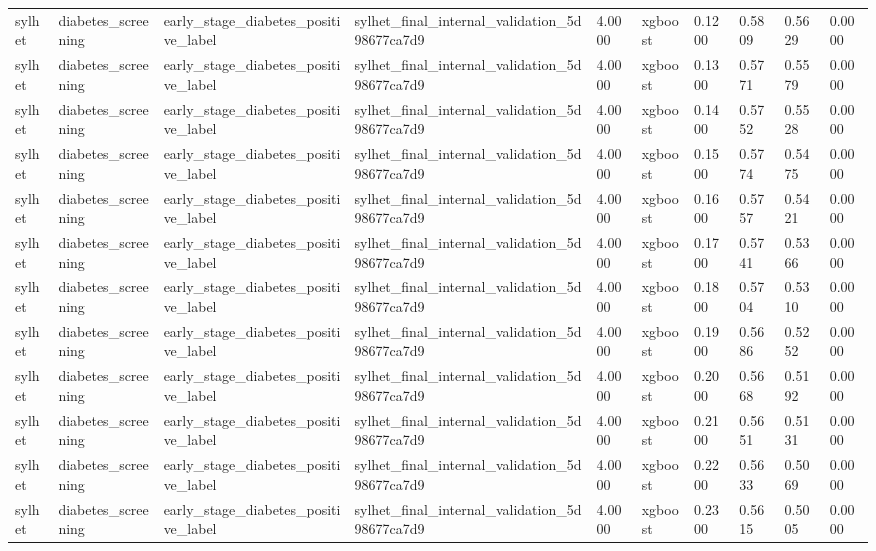 \begin{tabular}{llllllllll}
sylhet & diabetes\_screening & early\_stage\_diabetes\_positive\_label & sylhet\_final\_internal\_validation\_5d98677ca7d9 & 4.0000 & xgboost & 0.1200 & 0.5809 & 0.5629 & 0.0000 \\
sylhet & diabetes\_screening & early\_stage\_diabetes\_positive\_label & sylhet\_final\_internal\_validation\_5d98677ca7d9 & 4.0000 & xgboost & 0.1300 & 0.5771 & 0.5579 & 0.0000 \\
sylhet & diabetes\_screening & early\_stage\_diabetes\_positive\_label & sylhet\_final\_internal\_validation\_5d98677ca7d9 & 4.0000 & xgboost & 0.1400 & 0.5752 & 0.5528 & 0.0000 \\
sylhet & diabetes\_screening & early\_stage\_diabetes\_positive\_label & sylhet\_final\_internal\_validation\_5d98677ca7d9 & 4.0000 & xgboost & 0.1500 & 0.5774 & 0.5475 & 0.0000 \\
sylhet & diabetes\_screening & early\_stage\_diabetes\_positive\_label & sylhet\_final\_internal\_validation\_5d98677ca7d9 & 4.0000 & xgboost & 0.1600 & 0.5757 & 0.5421 & 0.0000 \\
sylhet & diabetes\_screening & early\_stage\_diabetes\_positive\_label & sylhet\_final\_internal\_validation\_5d98677ca7d9 & 4.0000 & xgboost & 0.1700 & 0.5741 & 0.5366 & 0.0000 \\
sylhet & diabetes\_screening & early\_stage\_diabetes\_positive\_label & sylhet\_final\_internal\_validation\_5d98677ca7d9 & 4.0000 & xgboost & 0.1800 & 0.5704 & 0.5310 & 0.0000 \\
sylhet & diabetes\_screening & early\_stage\_diabetes\_positive\_label & sylhet\_final\_internal\_validation\_5d98677ca7d9 & 4.0000 & xgboost & 0.1900 & 0.5686 & 0.5252 & 0.0000 \\
sylhet & diabetes\_screening & early\_stage\_diabetes\_positive\_label & sylhet\_final\_internal\_validation\_5d98677ca7d9 & 4.0000 & xgboost & 0.2000 & 0.5668 & 0.5192 & 0.0000 \\
sylhet & diabetes\_screening & early\_stage\_diabetes\_positive\_label & sylhet\_final\_internal\_validation\_5d98677ca7d9 & 4.0000 & xgboost & 0.2100 & 0.5651 & 0.5131 & 0.0000 \\
sylhet & diabetes\_screening & early\_stage\_diabetes\_positive\_label & sylhet\_final\_internal\_validation\_5d98677ca7d9 & 4.0000 & xgboost & 0.2200 & 0.5633 & 0.5069 & 0.0000 \\
sylhet & diabetes\_screening & early\_stage\_diabetes\_positive\_label & sylhet\_final\_internal\_validation\_5d98677ca7d9 & 4.0000 & xgboost & 0.2300 & 0.5615 & 0.5005 & 0.0000 \\

\end{tabular}
